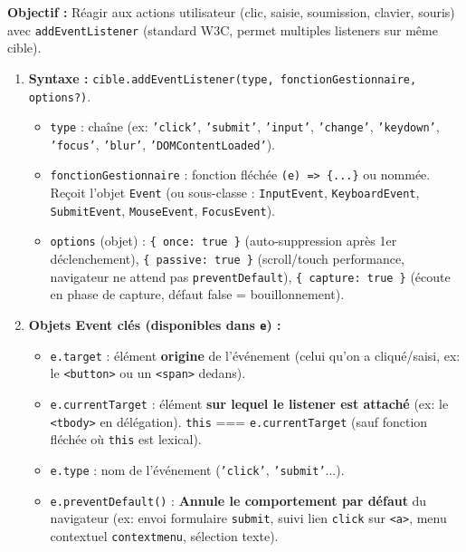 \documentclass[11pt]{article}
\begin{document}
\begin{methode}
    \textbf{Objectif :} Réagir aux actions utilisateur (clic, saisie, soumission, clavier, souris) avec \texttt{addEventListener} (standard W3C, permet multiples listeners sur même cible).
    \begin{enumerate}
        \item \textbf{Syntaxe :} \texttt{cible.addEventListener(type, fonctionGestionnaire, options?)}.
              \begin{itemize}
                  \item \texttt{type} : chaîne (ex: \texttt{'click'}, \texttt{'submit'}, \texttt{'input'}, \texttt{'change'}, \texttt{'keydown'}, \texttt{'focus'}, \texttt{'blur'}, \texttt{'DOMContentLoaded'}).
                  \item \texttt{fonctionGestionnaire} : fonction fléchée \texttt{(e) => \{...\}} ou nommée. Reçoit l'objet \texttt{Event} (ou sous-classe : \texttt{InputEvent}, \texttt{KeyboardEvent}, \texttt{SubmitEvent}, \texttt{MouseEvent}, \texttt{FocusEvent}).
                  \item \texttt{options} (objet) : \texttt{\{ once: true \}} (auto-suppression après 1er déclenchement), \texttt{\{ passive: true \}} (scroll/touch performance, navigateur ne attend pas \texttt{preventDefault}), \texttt{\{ capture: true \}} (écoute en phase de capture, défaut false = bouillonnement).
              \end{itemize}
        \item \textbf{Objets Event clés (disponibles dans \texttt{e}) :}
              \begin{itemize}
                  \item \texttt{e.target} : élément \textbf{origine} de l'événement (celui qu'on a cliqué/saisi, ex: le \texttt{<button>} ou un \texttt{<span>} dedans).
                  \item \texttt{e.currentTarget} : élément \textbf{sur lequel le listener est attaché} (ex: le \texttt{<tbody>} en délégation). \texttt{this} === \texttt{e.currentTarget} (sauf fonction fléchée où \texttt{this} est lexical).
                  \item \texttt{e.type} : nom de l'événement (\texttt{'click'}, \texttt{'submit'}...).
                  \item \texttt{e.preventDefault()} : \textbf{Annule le comportement par défaut} du navigateur (ex: envoi formulaire \texttt{submit}, suivi lien \texttt{click} sur \texttt{<a>}, menu contextuel \texttt{contextmenu}, sélection texte).

\end{itemize}
\end{enumerate}
\end{methode}
\end{document}
